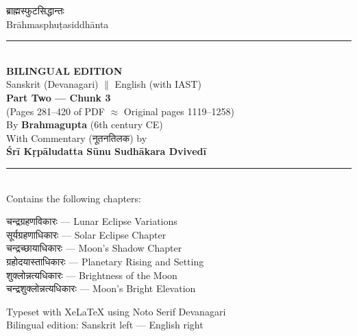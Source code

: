 \documentclass[11pt,a4paper]{article}
\newcommand{\dev}[1]{{\devanagarifont #1}}
\begin{document}
\begin{titlepage}
\begin{center}
\vspace*{1.5cm}

{\devanagarifont\fontsize{26}{30}\selectfont\color{titlecolor} ब्राह्मस्फुटसिद्धान्तः}\\[0.8cm]
{\fontsize{20}{24}\selectfont\color{sectioncolor} Brāhmasphuṭasiddhānta}\\[1.2cm]

\rule{0.7\textwidth}{1pt}\\[0.8cm]

{\LARGE\textbf{BILINGUAL EDITION}}\\[0.3cm]
{\large Sanskrit (Devanagari) $\parallel$ English (with IAST)}\\[1.2cm]

{\Large\textbf{Part Two — Chunk 3}}\\[0.3cm]
{\large (Pages 281--420 of PDF $\approx$ Original pages 1119--1258)}\\[1.5cm]

{\large By \textbf{Brahmagupta} (6th century CE)}\\[0.5cm]
{\large With Commentary (\dev{नूतनतिलक}) by}\\[0.2cm]
{\large \textbf{Śrī Kṛpāludatta Sūnu Sudhākara Dvivedī}}\\[1.5cm]

\rule{0.7\textwidth}{0.4pt}\\[0.8cm]

{\normalsize Contains the following chapters:}\\[0.3cm]
\begin{minipage}{0.8\textwidth}
\begin{center}
{\devanagarifont चन्द्रग्रहणविकारः} — Lunar Eclipse Variations\\[0.15cm]
{\devanagarifont सूर्यग्रहणाधिकारः} — Solar Eclipse Chapter\\[0.15cm]
{\devanagarifont चन्द्रच्छायाधिकारः} — Moon's Shadow Chapter\\[0.15cm]
{\devanagarifont ग्रहोदयास्ताधिकारः} — Planetary Rising and Setting\\[0.15cm]
{\devanagarifont शुक्लोन्नत्यधिकारः} — Brightness of the Moon\\[0.15cm]
{\devanagarifont चन्द्रशुक्लोन्नत्यधिकारः} — Moon's Bright Elevation\\[0.15cm]
\end{center}
\end{minipage}

\vfill
{\small Typeset with XeLaTeX using Noto Serif Devanagari}\\
{\small Bilingual edition: Sanskrit left — English right}

\end{center}
\end{titlepage}
\end{document}
